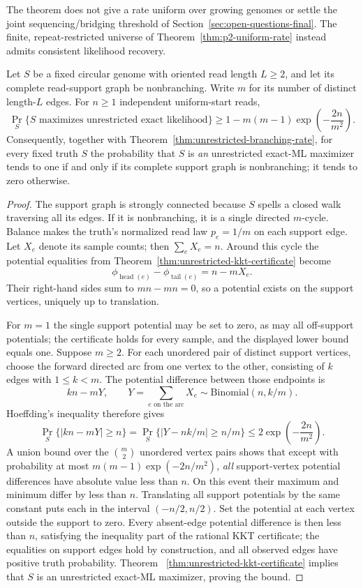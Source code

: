 The theorem does not give a rate uniform over growing
genomes or settle the joint sequencing/bridging threshold
of Section~\ref{sec:open-questions-final}. The finite,
repeat-restricted universe of
Theorem~\ref{thm:p2-uniform-rate} instead admits consistent
likelihood recovery.


\begin{proposition}
\label{prop:unrestricted-nonbranching-converse}
Let $S$ be a fixed circular genome with oriented read length $L\ge2$,
and let its complete read-support graph be nonbranching.
Write $m$ for its number of distinct length-$L$ edges. For
$n\ge1$ independent uniform-start reads,
\[
 \Pr_S\{S\text{ maximizes unrestricted exact likelihood}\}
 \ge 1-m(m-1)\exp\!\left(-\frac{2n}{m^2}\right).
\]
Consequently, together with
Theorem~\ref{thm:unrestricted-branching-rate}, for every
fixed truth $S$ the probability that $S$ is \emph{an}
unrestricted exact-ML maximizer tends to one if and only if
its complete support graph is nonbranching; it tends to zero
otherwise.
\end{proposition}
\begin{proof}
The support graph is strongly connected because $S$ spells
a closed walk traversing all its edges. If it is
nonbranching, it is a single directed $m$-cycle.
Balance makes the truth's normalized read law
$p_e=1/m$ on each support edge. Let $X_e$ denote its
sample counts; then $\sum_e X_e=n$. Around this cycle
the potential equalities from
Theorem~\ref{thm:unrestricted-kkt-certificate} become
\[
  \phi_{\operatorname{head}(e)}
  -\phi_{\operatorname{tail}(e)}=n-mX_e.
\]
Their right-hand sides sum to $mn-mn=0$, so a potential
exists on the support vertices, uniquely up to translation.

For $m=1$ the single support potential may be set to zero,
as may all off-support potentials; the certificate holds
for every sample, and the displayed lower bound equals one.
Suppose $m\ge2$. For each unordered pair of distinct support
vertices, choose the forward directed arc from one vertex
to the other, consisting of $k$ edges with $1\le k<m$.
The potential difference between those endpoints is
\[
  kn-mY,\qquad
  Y=\sum_{e\text{ on the arc}} X_e
      \sim\mathrm{Binomial}(n,k/m).
\]
Hoeffding's inequality therefore gives
\[
 \Pr_S\{|kn-mY|\ge n\}
 =\Pr_S\{|Y-nk/m|\ge n/m\}
 \le 2\exp\!\left(-\frac{2n}{m^2}\right).
\]
A union bound over the $\binom m2$ unordered vertex pairs
shows that except with probability at most
$m(m-1)\exp(-2n/m^2)$, \emph{all} support-vertex
potential differences have absolute value less than $n$.
On this event their maximum and minimum differ by less
than $n$. Translating all support potentials by the same
constant puts each in the interval $(-n/2,n/2)$.
Set the potential at each vertex outside the support to
zero. Every absent-edge potential difference is then
less than $n$, satisfying the inequality part of the
rational KKT certificate; the equalities on support
edges hold by construction, and all observed edges
have positive truth probability. Theorem~
\ref{thm:unrestricted-kkt-certificate} implies that
$S$ is an unrestricted exact-ML maximizer, proving
the bound.
\end{proof}

